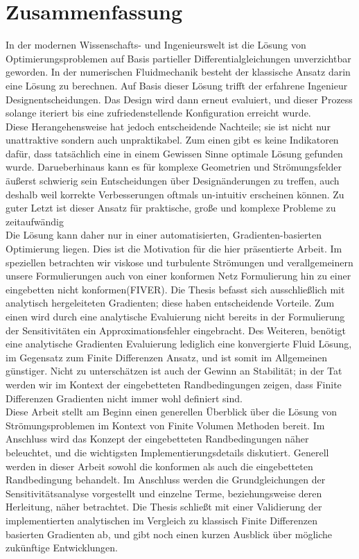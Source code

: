 \newpage

\section*{Zusammenfassung}
In der modernen Wissenschafts- und Ingenieurswelt ist die Lösung von Optimierungsproblemen auf Basis partieller Differentialgleichungen unverzichtbar geworden.
In der numerischen Fluidmechanik besteht der klassische Ansatz darin eine Lösung zu berechnen. Auf Basis dieser Lösung trifft der erfahrene Ingenieur Designentscheidungen. Das Design wird dann erneut evaluiert, und dieser Prozess solange iteriert bis eine zufriedenstellende Konfiguration erreicht wurde.\\
Diese Herangehensweise hat jedoch entscheidende Nachteile; sie ist nicht nur unattraktive sondern auch unpraktikabel. Zum einen gibt es keine Indikatoren dafür, dass tats\"achlich eine in einem Gewissen Sinne optimale L\"osung gefunden wurde. Darueberhinaus kann es für komplexe Geometrien und Str\"omungsfelder \"außerst schwierig sein Entscheidungen über Design\"anderungen zu treffen, auch deshalb weil korrekte Verbesserungen oftmals un-intuitiv erscheinen k\"onnen. Zu guter Letzt ist dieser Ansatz für praktische, große und komplexe Probleme zu zeitaufw\"andig\\
Die L\"osung kann daher nur in einer automatisierten, Gradienten-basierten Optimierung liegen. Dies ist die Motivation f\"ur die hier pr\"asentierte Arbeit. Im speziellen betrachten wir viskose und turbulente Str\"omungen und verallgemeinern unsere Formulierungen auch von einer konformen Netz Formulierung hin zu einer eingebetten nicht konformen(FIVER). Die Thesis befasst sich ausschließlich mit analytisch hergeleiteten Gradienten; diese haben entscheidende Vorteile. Zum einen wird durch eine analytische Evaluierung nicht bereits in der Formulierung der Sensitivit\"aten ein Approximationsfehler eingebracht. Des Weiteren, ben\"otigt eine analytische Gradienten Evaluierung lediglich eine konvergierte Fluid L\"osung, im Gegensatz zum Finite Differenzen Ansatz, und ist somit im Allgemeinen günstiger. Nicht zu untersch\"atzen ist auch der Gewinn an Stabilit\"at; in der Tat werden wir im Kontext der eingebetteten Randbedingungen zeigen, dass Finite Differenzen Gradienten nicht immer wohl definiert sind.\\
Diese Arbeit stellt am Beginn einen generellen Überblick über die L\"osung von Str\"omungsproblemen im Kontext von Finite Volumen Methoden bereit. Im Anschluss wird das Konzept der eingebetteten Randbedingungen n\"aher beleuchtet, und die wichtigsten Implementierungsdetails diskutiert. Generell werden in dieser Arbeit sowohl die konformen als auch die eingebetteten Randbedingung behandelt. Im Anschluss werden die Grundgleichungen der Sensitivit\"atsanalyse vorgestellt und einzelne Terme, beziehungsweise deren Herleitung, n\"aher betrachtet. Die Thesis schließt mit einer Validierung der implementierten analytischen im Vergleich zu klassisch Finite Differenzen basierten Gradienten ab, und gibt noch einen kurzen Ausblick über m\"ogliche zukünftige Entwicklungen.

